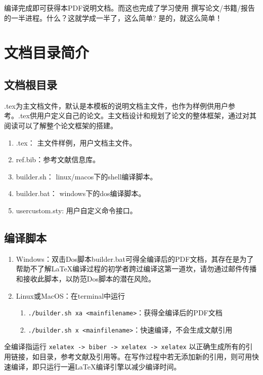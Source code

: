 编译完成即可获得本PDF说明文档。而这也完成了学习使用 \projectname 撰写论文/书籍/报告的一半进程。什么？这就学成一半了，这么简单? 是的，就这么简单！

\section{文档目录简介}

\subsection{文档根目录}

\projectname.tex为主文档文件，默认是本模板的说明文档主文件，也作为样例供用户参考。\projectname.tex供用户定义自己的论文。主文档设计和规划了论文的整体框架，通过对其阅读可以了解整个论文框架的搭建。


\begin{enumerate}
    \item \projectname.tex： 主文件样例，用户文档主文件。
    \item ref.bib：参考文献信息库。
    \item builder.sh： linux/macos下的shell编译脚本。
    \item builder.bat： windows下的dos编译脚本。
    \item usercustom.sty: 用户自定义命令接口。
\end{enumerate}

\subsection{编译脚本}

\begin{enumerate}
    \item Windows：双击Dos脚本builder.bat可得全编译后的PDF文档，其存在是为了帮助不了解\LaTeX{}编译过程的初学者跨过编译这第一道坎，请勿通过邮件传播和接收此脚本，以防范Dos脚本的潜在风险。
    \item Linux或MacOS：在terminal中运行
        \begin{enumerate}
            \item \verb|./builder.sh xa <mainfilename>|：获得全编译后的PDF文档
            \item \verb|./builder.sh x <mainfilename>|：快速编译，不会生成文献引用
        \end{enumerate}
\end{enumerate}

全编译指运行 \verb|xelatex -> biber -> xelatex -> xelatex| 以正确生成所有的引用链接，如目录，参考文献及引用等。在写作过程中若无添加新的引用，则可用快速编译，即只运行一遍\LaTeX{}编译引擎以减少编译时间。

